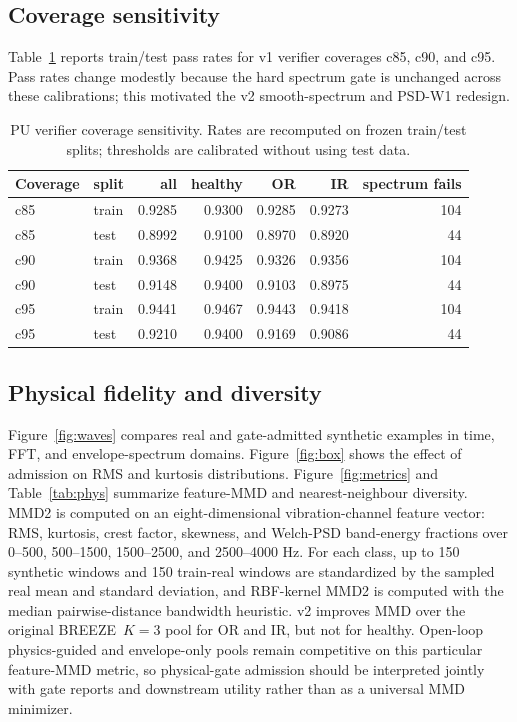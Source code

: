 \documentclass[review,3p,times]{elsarticle}
\newcommand{\breeze}{BREEZE}
\begin{document}
\subsection{Coverage sensitivity}

Table~\ref{tab:coverage} reports train/test pass rates for v1 verifier
coverages c85, c90, and c95. Pass rates change modestly because the hard
spectrum gate is unchanged across these calibrations; this motivated the v2
smooth-spectrum and PSD-W1 redesign.

\begin{table}[H]
\centering
\caption{PU verifier coverage sensitivity. Rates are recomputed on frozen
train/test splits; thresholds are calibrated without using test data.}
\label{tab:coverage}
\begin{tabular}{llrrrrr}
\toprule
Coverage & split & all & healthy & OR & IR & spectrum fails \\
\midrule
c85 & train & 0.9285 & 0.9300 & 0.9285 & 0.9273 & 104 \\
c85 & test  & 0.8992 & 0.9100 & 0.8970 & 0.8920 & 44 \\
c90 & train & 0.9368 & 0.9425 & 0.9326 & 0.9356 & 104 \\
c90 & test  & 0.9148 & 0.9400 & 0.9103 & 0.8975 & 44 \\
c95 & train & 0.9441 & 0.9467 & 0.9443 & 0.9418 & 104 \\
c95 & test  & 0.9210 & 0.9400 & 0.9169 & 0.9086 & 44 \\
\bottomrule
\end{tabular}
\end{table}

\subsection{Physical fidelity and diversity}

Figure~\ref{fig:waves} compares real and gate-admitted synthetic examples in
time, FFT, and envelope-spectrum domains. Figure~\ref{fig:box} shows the effect
of admission on RMS and kurtosis distributions. Figure~\ref{fig:metrics} and
Table~\ref{tab:phys} summarize feature-MMD and nearest-neighbour diversity.
MMD2 is computed on an eight-dimensional
vibration-channel feature vector: RMS, kurtosis, crest factor, skewness, and
Welch-PSD band-energy fractions over 0--500, 500--1500, 1500--2500, and
2500--4000 Hz. For each class, up to 150 synthetic windows and 150 train-real
windows are standardized by the sampled real mean and standard deviation, and
RBF-kernel MMD2 is computed with the median pairwise-distance bandwidth
heuristic. v2 improves MMD over the original \breeze\ $K=3$
pool for OR and IR, but not for healthy. Open-loop physics-guided and
envelope-only pools remain competitive on this particular feature-MMD metric,
so physical-gate admission should be interpreted jointly with gate reports and
downstream utility rather than as a universal MMD minimizer.
\end{document}
